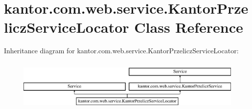 \hypertarget{classkantor_1_1com_1_1web_1_1service_1_1_kantor_przelicz_service_locator}{\section{kantor.\+com.\+web.\+service.\+Kantor\+Przelicz\+Service\+Locator Class Reference}
\label{classkantor_1_1com_1_1web_1_1service_1_1_kantor_przelicz_service_locator}
}
Inheritance diagram for kantor.\+com.\+web.\+service.\+Kantor\+Przelicz\+Service\+Locator\+:\begin{figure}[H]
\begin{center}
\leavevmode
\includegraphics[height=2.560976cm]{classkantor_1_1com_1_1web_1_1service_1_1_kantor_przelicz_service_locator}
\end{center}
\end{figure}
